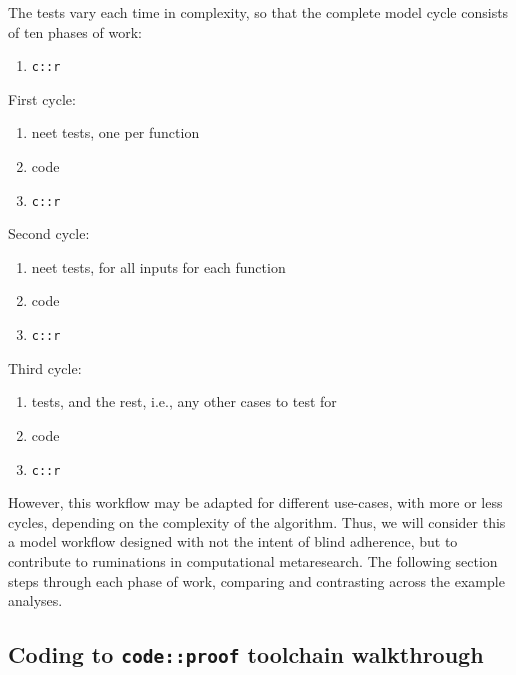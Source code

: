 \documentclass[
]{article}
\providecommand{\tightlist}{%
  \setlength{\itemsep}{0pt}\setlength{\parskip}{0pt}}
\begin{document}
The tests vary each time in complexity, so that the complete model cycle consists of ten phases of work:

\begin{enumerate}
\def\labelenumi{\arabic{enumi}.}
\tightlist
\item
  \texttt{c::r}
\end{enumerate}

First cycle:

\begin{enumerate}
\def\labelenumi{\arabic{enumi}.}
\setcounter{enumi}{1}
\tightlist
\item
  neet tests, one per function
\item
  code
\item
  \texttt{c::r}
\end{enumerate}

Second cycle:

\begin{enumerate}
\def\labelenumi{\arabic{enumi}.}
\setcounter{enumi}{4}
\tightlist
\item
  neet tests, for all inputs for each function
\item
  code
\item
  \texttt{c::r}
\end{enumerate}

Third cycle:

\begin{enumerate}
\def\labelenumi{\arabic{enumi}.}
\setcounter{enumi}{7}
\tightlist
\item
  tests, and the rest, i.e., any other cases to test for
\item
  code
\item
  \texttt{c::r}
\end{enumerate}

However, this workflow may be adapted for different use-cases, with more or less cycles, depending on the complexity of the algorithm. Thus, we will consider this a model workflow designed with not the intent of blind adherence, but to contribute to ruminations in computational metaresearch. The following section steps through each phase of work, comparing and contrasting across the example analyses.

\hypertarget{coding-to-codeproof-toolchain-walkthrough}{%
\subsection{\texorpdfstring{Coding to \texttt{code::proof} toolchain walkthrough}{Coding to code::proof toolchain walkthrough}}\label{coding-to-codeproof-toolchain-walkthrough}}
\end{document}
